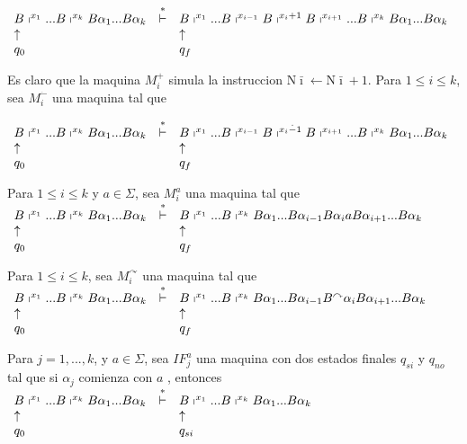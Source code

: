 \(\displaystyle \begin{array}{lcl} B\shortmid ^{x_{1}}...B\shortmid ^{x_{k}}B\alpha _{1}...B\alpha _{k} & \overset{\ast }{\vdash } & B\shortmid ^{x_{1}}...B\shortmid ^{x_{i-1}}B\shortmid ^{x_{i}+1}B\shortmid ^{x_{i+1}}...B\shortmid ^{x_{k}}B\alpha _{1}...B\alpha _{k} \\ \uparrow & & \uparrow \\ q_{0} & & q_{f} \end{array} \)

Es claro que la maquina \(M_{i}^{+}\) simula la instruccion \(\mathrm{N}\bar{ \imath}\leftarrow \mathrm{N}\bar{\imath}+1\).
Para \(1\leq i\leq k\), sea \(M_{i}^{\dot{-}}\) una maquina tal que

\(\displaystyle \begin{array}{lcl} B\shortmid ^{x_{1}}...B\shortmid ^{x_{k}}B\alpha _{1}...B\alpha _{k} & \overset{\ast }{\vdash } & B\shortmid ^{x_{1}}...B\shortmid ^{x_{i-1}}B\shortmid ^{x_{i}\dot{-}1}B\shortmid ^{x_{i+1}}...B\shortmid ^{x_{k}}B\alpha _{1}...B\alpha _{k} \\ \uparrow & & \uparrow \\ q_{0} & & q_{f} \end{array} \)

Para \(1\leq i\leq k\) y \(a\in \Sigma \), sea \(M_{i}^{a}\) una maquina tal que
\(\displaystyle \begin{array}{lcl} B\shortmid ^{x_{1}}...B\shortmid ^{x_{k}}B\alpha _{1}...B\alpha _{k} & \overset{\ast }{\vdash } & B\shortmid ^{x_{1}}...B\shortmid ^{x_{k}}B\alpha _{1}...B\alpha _{i-1}B\alpha _{i}aB\alpha _{i+1}...B\alpha _{k} \\ \uparrow & & \uparrow \\ q_{0} & & q_{f} \end{array} \)

Para \(1\leq i\leq k\), sea \(M_{i}^{\curvearrowright }\) una maquina tal que
\(\displaystyle \begin{array}{lcl} B\shortmid ^{x_{1}}...B\shortmid ^{x_{k}}B\alpha _{1}...B\alpha _{k} & \overset{\ast }{\vdash } & B\shortmid ^{x_{1}}...B\shortmid ^{x_{k}}B\alpha _{1}...B\alpha _{i-1}B^{\curvearrowright }\alpha _{i}B\alpha _{i+1}...B\alpha _{k} \\ \uparrow & & \uparrow \\ q_{0} & & q_{f} \end{array} \)

Para \(j=1,...,k\), y \(a\in \Sigma \), sea \(IF_{j}^{a}\) una maquina con dos estados finales \(q_{si}\) y \(q_{no}\) tal que si \(\alpha _{j}\) comienza con \(a\) , entonces
\(\displaystyle \begin{array}{lcl} B\shortmid ^{x_{1}}...B\shortmid ^{x_{k}}B\alpha _{1}...B\alpha _{k} & \overset{\ast }{\vdash } & B\shortmid ^{x_{1}}...B\shortmid ^{x_{k}}B\alpha _{1}...B\alpha _{k} \\ \uparrow & & \uparrow \\ q_{0} & & q_{si} \end{array} \)

